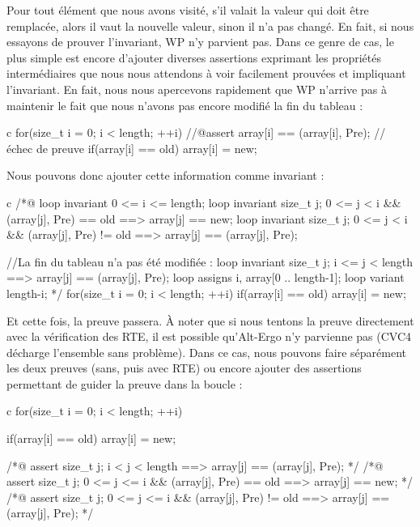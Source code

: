 \documentclass[middle]{zmdocument}
\begin{document}
Pour tout élément que nous avons visité, s'il valait la valeur qui doit être
remplacée, alors il vaut la nouvelle valeur, sinon il n'a pas changé. En fait, si nous essayons de prouver l'invariant, WP n'y parvient pas. Dans ce genre de 
cas, le plus simple est encore d'ajouter diverses assertions exprimant les 
propriétés intermédiaires que nous nous attendons à voir facilement prouvées 
et impliquant l'invariant. En fait, nous nous apercevons rapidement que WP 
n'arrive pas à maintenir le fait que nous n'avons pas encore modifié la fin du 
tableau :



\begin{CodeBlock}{c}
for(size_t i = 0; i < length; ++i){
    //@assert array[i] == \at(array[i], Pre); // échec de preuve
    if(array[i] == old) array[i] = new;
}
\end{CodeBlock}



Nous pouvons donc ajouter cette information comme invariant :



\begin{CodeBlock}{c}
/*@
  loop invariant 0 <= i <= length;
  loop invariant \forall size_t j; 0 <= j < i && \at(array[j], Pre) == old 
                   ==> array[j] == new;
  loop invariant \forall size_t j; 0 <= j < i && \at(array[j], Pre) != old 
                   ==> array[j] == \at(array[j], Pre);

  //La fin du tableau n'a pas été modifiée :
  loop invariant \forall size_t j; i <= j < length
                     ==> array[j] == \at(array[j], Pre);
  loop assigns i, array[0 .. length-1];
  loop variant length-i;
*/
for(size_t i = 0; i < length; ++i){
  if(array[i] == old) array[i] = new;
}
\end{CodeBlock}



Et cette fois, la preuve passera. À noter que si nous tentons la preuve 
directement avec la vérification des RTE, il est possible qu'Alt-Ergo n'y
parvienne pas (CVC4 décharge l'ensemble sans problème). Dans ce cas, nous
pouvons faire séparément les deux preuves (sans, puis avec RTE) ou encore 
ajouter des assertions permettant de guider la preuve dans la boucle :



\begin{CodeBlock}{c}
for(size_t i = 0; i < length; ++i){
  if(array[i] == old) array[i] = new;

  /*@ assert \forall size_t j; i < j < length 
               ==> array[j] == \at(array[j], Pre);                      */
  /*@ assert \forall size_t j; 0 <= j <= i && \at(array[j], Pre) == old 
               ==> array[j] == new;                                     */
  /*@ assert \forall size_t j; 0 <= j <= i && \at(array[j], Pre) != old 
               ==> array[j] == \at(array[j], Pre);                      */    
}
\end{CodeBlock}
\end{document}
